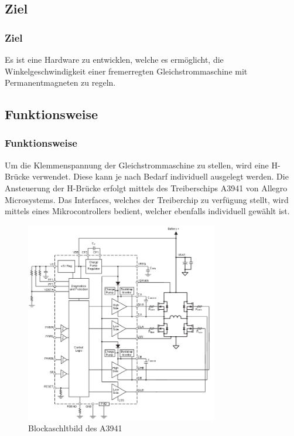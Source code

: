 \ifSTANDALONE
\subsection{Ziel}
\fi
\ifEMBED
\subsubsection{Ziel}
\fi
Es ist eine Hardware zu entwicklen, welche es ermöglicht, die
Winkelgeschwindigkeit einer fremerregten Gleichstrommaschine mit
Permanentmagneten zu regeln.

\ifSTANDALONE
\subsection{Funktionsweise}
\fi
\ifEMBED
\subsubsection{Funktionsweise}
\fi
Um die Klemmenspannung der Gleichstrommaschine zu stellen, wird eine
H-Brücke verwendet. Diese kann je nach Bedarf individuell ausgelegt
werden. Die Ansteuerung der H-Brücke erfolgt mittels des Treiberschips
A3941 von Allegro Microsystems. Das Interfaces, welches der
Treiberchip zu verfügung stellt, wird mittels eines Mikrocontrollers
bedient, welcher ebenfalls individuell gewählt ist.

\begin{figure}[h!]
	\centering
	\includegraphics[width=0.75\textwidth]{src/DC/fig/a3941-functional.png}
	\caption{Blockaschltbild des A3941}
	\label{fig:a3941-functional}
\end{figure}

